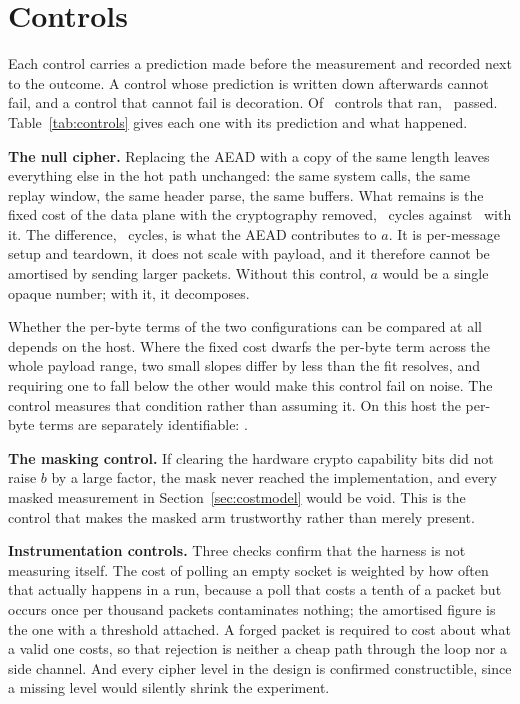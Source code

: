 \section{Controls}
\label{sec:controls}

Each control carries a prediction made before the measurement and recorded next
to the outcome. A control whose prediction is written down afterwards cannot
fail, and a control that cannot fail is decoration. Of \ctlRan\ controls that
ran, \ctlPassed\ passed. Table~\ref{tab:controls} gives each one with its
prediction and what happened.

\noindent\textbf{The null cipher.}
Replacing the AEAD with a copy of the same length leaves everything else in the
hot path unchanged: the same system calls, the same replay window, the same
header parse, the same buffers. What remains is the fixed cost of the data plane
with the cryptography removed, \ctlNullFixed\ cycles against \ctlAEADFixed\ with
it. The difference, \ctlAEADOnlyFixed\ cycles, is what the AEAD contributes to
$a$. It is per-message setup and teardown, it does not scale with payload, and
it therefore cannot be amortised by sending larger packets. Without this
control, $a$ would be a single opaque number; with it, it decomposes.

Whether the per-byte terms of the two configurations can be compared at all
depends on the host. Where the fixed cost dwarfs the per-byte term across the
whole payload range, two small slopes differ by less than the fit resolves, and
requiring one to fall below the other would make this control fail on noise. The
control measures that condition rather than assuming it. On this host the
per-byte terms are separately identifiable: \ctlPerByteIdentifiable.

\noindent\textbf{The masking control.}
If clearing the hardware crypto capability bits did not raise $b$ by a large
factor, the mask never reached the implementation, and every masked measurement
in Section~\ref{sec:costmodel} would be void. This is the control that makes the
masked arm trustworthy rather than merely present.

\noindent\textbf{Instrumentation controls.}
Three checks confirm that the harness is not measuring itself. The cost of
polling an empty socket is weighted by how often that actually happens in a run,
because a poll that costs a tenth of a packet but occurs once per thousand
packets contaminates nothing; the amortised figure is the one with a threshold
attached. A forged packet is required to cost about what a valid one costs, so
that rejection is neither a cheap path through the loop nor a side channel. And
every cipher level in the design is confirmed constructible, since a missing
level would silently shrink the experiment.

\begin{table}[t]
\caption{Controls, with the prediction each was given before it ran.}
\label{tab:controls}
\centering\footnotesize

\end{table}
